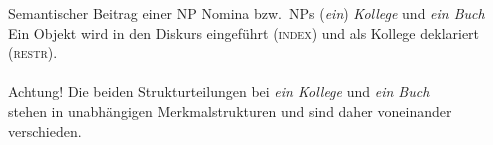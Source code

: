 \begin{frame}
  {Semantischer Beitrag einer NP}
  \onslide<+->
  \onslide<+->
  \alert{Nomina bzw.\ NPs (\textit{ein}) \textit{Kollege} und \textit{ein Buch}}\\
  Ein Objekt wird in den Diskurs eingeführt (\textsc{index}) und als Kollege deklariert (\textsc{restr}).\\
  \Zeile 
  \onslide<+->
  \onslide<+->\hspace{2em}%
  \\
  \Halbzeile
  \onslide<+->
  \footnotesize Achtung! Die beiden Strukturteilungen  bei \textit{ein Kollege} und \textit{ein Buch}\\
  stehen in unabhängigen Merkmalstrukturen und sind daher voneinander verschieden.
\end{frame}

